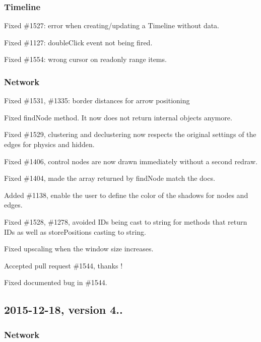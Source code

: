 \subsubsection*{Timeline}


\begin{DoxyItemize}
\item Fixed \#1527\+: error when creating/updating a Timeline without data.
\item Fixed \#1127\+: {\ttfamily double\+Click} event not being fired.
\item Fixed \#1554\+: wrong cursor on readonly range items.
\end{DoxyItemize}

\subsubsection*{Network}


\begin{DoxyItemize}
\item Fixed \#1531, \#1335\+: border distances for arrow positioning
\item Fixed find\+Node method. It now does not return internal objects anymore.
\item Fixed \#1529, clustering and declustering now respects the original settings of the edges for physics and hidden.
\item Fixed \#1406, control nodes are now drawn immediately without a second redraw.
\item Fixed \#1404, made the array returned by find\+Node match the docs.
\item Added \#1138, enable the user to define the color of the shadows for nodes and edges.
\item Fixed \#1528, \#1278, avoided ID\textquotesingle{}s being cast to string for methods that return ID\textquotesingle{}s as well as store\+Positions casting to string.
\item Fixed upscaling when the window size increases.
\item Accepted pull request \#1544, thanks !
\item Fixed documented bug in \#1544.
\end{DoxyItemize}

\subsection*{2015-\/12-\/18, version 4..}

\subsubsection*{Network}


